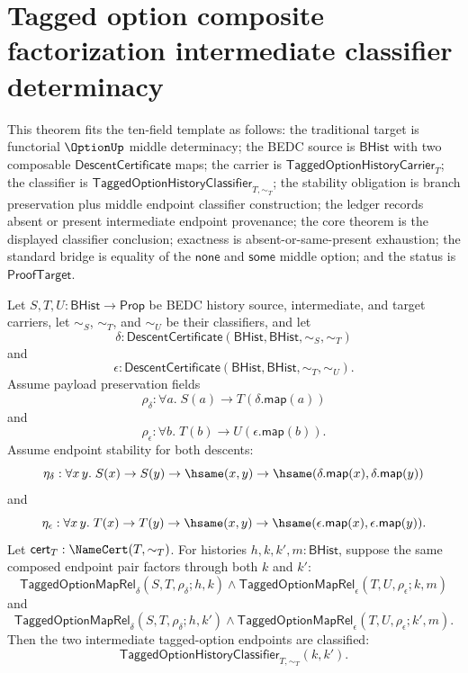 \section{Tagged option composite factorization intermediate classifier determinacy}
\label{sec:option-composite-factorization-intermediate-classifier}

\begin{theorem}
\label{thm:tagged-option-maprel-composite-factorization-intermediate-classifier}
This theorem fits the ten-field template as follows: the traditional target is
functorial $\OptionUp$ middle determinacy; the BEDC source is $\mathsf{BHist}$
with two composable $\mathsf{DescentCertificate}$ maps; the carrier is
$\mathsf{TaggedOptionHistoryCarrier}_T$; the classifier is
$\mathsf{TaggedOptionHistoryClassifier}_{T,\sim_T}$; the stability obligation
is branch preservation plus middle endpoint classifier construction; the ledger
records absent or present intermediate endpoint provenance; the core theorem is
the displayed classifier conclusion; exactness is absent-or-same-present
exhaustion; the standard bridge is equality of the $\mathsf{none}$ and
$\mathsf{some}$ middle option; and the status is $\mathsf{ProofTarget}$.

Let $S,T,U:\mathsf{BHist}\to\mathsf{Prop}$ be BEDC history source,
intermediate, and target carriers, let $\sim_S$, $\sim_T$, and $\sim_U$ be their
classifiers, and let
$$
\delta:\mathsf{DescentCertificate}(\mathsf{BHist},\mathsf{BHist},\sim_S,\sim_T)
$$
and
$$
\epsilon:\mathsf{DescentCertificate}(\mathsf{BHist},\mathsf{BHist},\sim_T,\sim_U).
$$
Assume payload preservation fields
$$
\rho_{\delta}:\forall a.\;S(a)\to T(\delta.\mathsf{map}(a))
$$
and
$$
\rho_{\epsilon}:\forall b.\;T(b)\to U(\epsilon.\mathsf{map}(b)).
$$
Assume endpoint stability for both descents:
$$
\eta_{\delta}:\forall x\,y.\;
S(x)\to S(y)\to \hsame(x,y)\to
\hsame(\delta.\mathsf{map}(x),\delta.\mathsf{map}(y))
$$
and
$$
\eta_{\epsilon}:\forall x\,y.\;
T(x)\to T(y)\to \hsame(x,y)\to
\hsame(\epsilon.\mathsf{map}(x),\epsilon.\mathsf{map}(y)).
$$
Let $\mathsf{cert}_T:\NameCert(T,\sim_T)$. For histories
$h,k,k',m:\mathsf{BHist}$, suppose the same composed endpoint pair factors
through both $k$ and $k'$:
$$
\mathsf{TaggedOptionMapRel}_{\delta}(S,T,\rho_{\delta};h,k)
\land
\mathsf{TaggedOptionMapRel}_{\epsilon}(T,U,\rho_{\epsilon};k,m)
$$
and
$$
\mathsf{TaggedOptionMapRel}_{\delta}(S,T,\rho_{\delta};h,k')
\land
\mathsf{TaggedOptionMapRel}_{\epsilon}(T,U,\rho_{\epsilon};k',m).
$$
Then the two intermediate tagged-option endpoints are classified:
$$
\mathsf{TaggedOptionHistoryClassifier}_{T,\sim_T}(k,k').
$$
\end{theorem}
